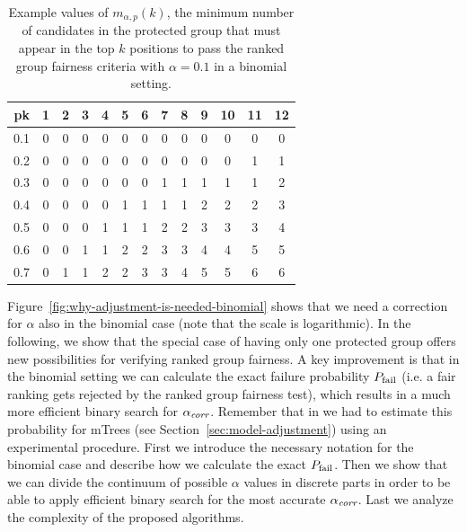 \begin{table}[h!]
	\small\begin{tabular}{r|cccccccccccc}
		\diaghead{some text}%
		{p}{k}&
		1 & 2 & 3 & 4 & 5 & 6 & 7 & 8 & 9 & 10 & 11 & 12 \\ \midrule
		0.1      & 0 & 0 & 0 & 0 & 0 & 0 & 0 & 0 & 0 & 0  &  0 &  0 \\
		0.2      & 0 & 0 & 0 & 0 & 0 & 0 & 0 & 0 & 0 & 0  &  1 &  1 \\
		0.3      & 0 & 0 & 0 & 0 & 0 & 0 & 1 & 1 & 1 & 1  &  1 &  2 \\
		0.4      & 0 & 0 & 0 & 0 & 1 & 1 & 1 & 1 & 2 & 2  &  2 &  3 \\
		0.5      & 0 & 0 & 0 & 1 & 1 & 1 & 2 & 2 & 3 & 3  &  3 &  4 \\
		0.6      & 0 & 0 & 1 & 1 & 2 & 2 & 3 & 3 & 4 & 4  &  5 &  5 \\
		0.7      & 0 & 1 & 1 & 2 & 2 & 3 & 3 & 4 & 5 & 5  &  6 &  6 \\
		\bottomrule
	\end{tabular}
	\caption{Example values of $m_{\alpha,p}(k)$, the minimum number of candidates in the protected group that must appear in the top $k$ positions to pass the ranked group fairness criteria with $\alpha=0.1$ in a binomial setting.}
	\label{tbl:ranked_group_fairness_table}
\end{table}

Figure~\ref{fig:why-adjustment-is-needed-binomial} shows that we need a correction for $\alpha$ also in the binomial case (note that the scale is logarithmic).
%
In the following, we show that the special case of having only one protected group offers new possibilities for verifying ranked group fairness. 
%
A key improvement is that in the binomial setting we can calculate the exact failure probability $P_{\operatorname{fail}}$ (i.e. a fair ranking gets rejected by the ranked group fairness test), which results in a much more efficient binary search for $\alpha_\textit{corr}$. 
%
Remember that in we had to estimate this probability for mTrees (see Section~\ref{sec:model-adjustment}) using an experimental procedure. 
%
First we introduce the necessary notation for the binomial case and describe how we calculate the exact $P_{\operatorname{fail}}$.
%
Then we show that we can divide the continuum of possible $\alpha$ values in discrete parts in order to be able to apply efficient binary search for the most accurate $\alpha_\textit{corr}$.
%
Last we analyze the complexity of the proposed algorithms.
%


